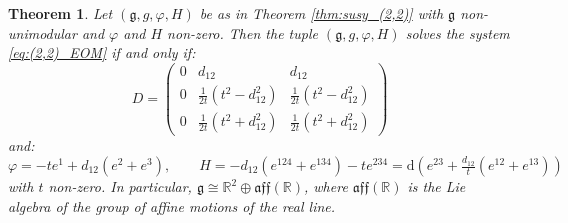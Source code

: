 \documentclass[10pt,reqno]{amsart}
\newtheorem{theorem}{Theorem}[section]
\theoremstyle{definition}
\theoremstyle{remark}
\newcommand{\R}{\mathbb{R}}
\renewcommand{\d}{\mathrm{d}}
\begin{document}
\begin{theorem}\label{thm:EOM_(2,2)_non_unimodular}
    Let $(\mathfrak{g},g,\varphi,H)$ be as in Theorem \ref{thm:susy_(2,2)} with $\mathfrak{g}$ non-unimodular and $\varphi$ and $H$ non-zero. Then the tuple $(\mathfrak{g},g,\varphi,H)$ solves the system \eqref{eq:(2,2)_EOM} if and only if: $$D=\begin{pmatrix}
        0&d_{12}&d_{12}\\
        0&\frac{1}{2t}(t^2-d_{12}^2)&\frac{1}{2t}(t^2-d_{12}^2)\\
        0&\frac{1}{2t}(t^2+d_{12}^2)&\frac{1}{2t}(t^2+d_{12}^2)
    \end{pmatrix}$$ and: $$\varphi=-te^1+d_{12}(e^2+e^3),\qquad H=-d_{12}(e^{124}+e^{134})-te^{234}=\d(e^{23}+\tfrac{d_{12}}{t}(e^{12}+e^{13}))$$ with $t$ non-zero. In particular, $\mathfrak{g}\cong\R^2\oplus\mathfrak{aff}(\R)$, where $\mathfrak{aff}(\R)$ is the Lie algebra of the group of affine motions of the real line.
\end{theorem}
\end{document}
